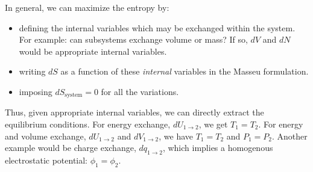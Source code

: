 \documentclass[12pt]{article}
\begin{document}
In general, we can maximize the entropy by:
\begin{itemize}
\item defining the internal variables which may be exchanged within the system. For example: can subsystems exchange volume or mass? If so, $dV$ and $dN$ would be appropriate internal variables.
\item writing $dS$ as a function of these \emph{internal} variables in the Masseu formulation.
\item imposing $dS_\text{system} = 0$ for all the variations.
\end{itemize}
Thus, given appropriate internal variables, we can directly extract the equilibrium conditions.  For energy exchange, $dU_{1\rightarrow 2}$, we get $T_1 = T_2$.  For energy and volume exchange, $dU_{1\rightarrow 2}$ and $dV_{1\rightarrow 2}$, we have $T_1 = T_2$ and $P_1 = P_2$.  Another example would be charge exchange, $dq_{1\rightarrow 2}$, which implies a homogenous electrostatic potential: $\phi_1 = \phi_2$.



\end{document}

